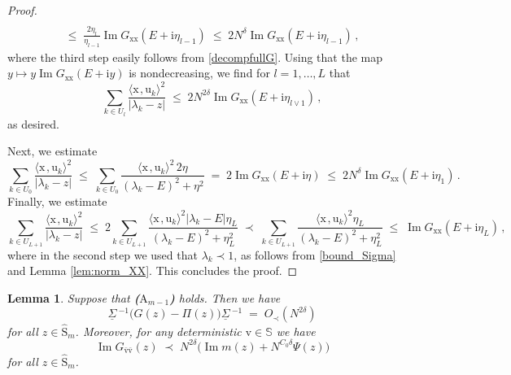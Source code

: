 \documentclass[11pt]{article} %
\numberwithin{equation}{section}
\numberwithin{figure}{section}
\theoremstyle{plain} %
\newtheorem{lemma}[theorem]{Lemma}
\theoremstyle{definition} %
\newcommand{\f}[1]{\boldsymbol{\mathrm{#1}}} %
\newcommand{\bb}{\mathbb} %
\newcommand{\ul}[1]{\underline{#1} \!\,} %
\newcommand{\wh}{\widehat}
\newcommand{\ii}{\mathrm{i}}
\renewcommand{\leq}{\leqslant}
\newcommand{\pb}[1]{\bigl({#1}\bigr)}
\newcommand{\abs}[1]{\lvert #1 \rvert}
\newcommand{\scalar}[2]{\langle{#1} \mspace{2mu}, {#2}\rangle}
\DeclareMathOperator{\im}{Im}
\begin{document}
\begin{proof}
\begin{multline*}
\\
\leq\; \frac{2 \eta_l}{\eta_{l - 1}} \im G_{\f x \f x}(E + \ii \eta_{l - 1}) \;\leq\; 2 N^\delta \im G_{\f x \f x}(E + \ii \eta_{l - 1})\,,
\end{multline*}
where the third step easily follows from \eqref{decompfullG}. Using that the map $y \mapsto y \im G_{\f x \f x}(E + \ii y)$ is nondecreasing, we find for $l = 1, \dots, L$ that
\begin{equation*}
\sum_{k \in U_l} \frac{\scalar{\f x}{\f u_k}^2}{\abs{\lambda_k - z}} \;\leq\;  2 N^{2 \delta} \im G_{\f x \f x}(E + \ii \eta_{l \vee 1})\,,
\end{equation*}
as desired.

Next, we estimate
\begin{equation*}
\sum_{k \in U_0} \frac{\scalar{\f x}{\f u_k}^2}{\abs{\lambda_k - z}} \;\leq\; \sum_{k \in U_0} \frac{\scalar{\f x}{\f u_k}^2 \, 2  \eta}{(\lambda_k - E)^2 + \eta^2} \;=\; 2 \im G_{\f x \f x} (E + \ii \eta) \;\leq\; 2 N^\delta \im G_{\f x \f x} (E + \ii \eta_1)\,.
\end{equation*}
Finally, we estimate
\begin{equation*}
\sum_{k \in U_{L+1}} \frac{\scalar{\f x}{\f u_k}^2}{\abs{\lambda_k - z}} \;\leq\; 2\sum_{k \in U_{L+1}} \frac{\scalar{\f x}{\f u_k}^2 \abs{\lambda_k - E} \eta_L}{(\lambda_k - E)^2 + \eta_L^2} \;\prec\; \sum_{k \in U_{L+1}} \frac{\scalar{\f x}{\f u_k}^2 \eta_L}{(\lambda_k - E)^2 + \eta_L^2} \;\leq\; \im G_{\f x \f x}(E + \ii \eta_L)\,,
\end{equation*}
where in the second step we used that $\lambda_k \prec 1$, as follows from \eqref{bound_Sigma} and Lemma \ref{lem:norm_XX}. This concludes the proof.
\end{proof}


\begin{lemma} \label{cor:rough_bound}
Suppose that \textbf{($\f A_{m - 1}$)} holds. Then we have
\begin{equation} \label{a_priori_1}
\ul \Sigma^{-1} \pb{G(z) - \Pi(z)} \ul \Sigma^{-1} \;=\; O_\prec(N^{2 \delta})
\end{equation}
for all $z \in \wh{\f S}_m$.
Moreover, for any deterministic $\f v \in \bb S$ we have
\begin{equation} \label{a_priori_2}
\im G_{\bar {\f v} \bar {\f v}}(z) \;\prec\; N^{2 \delta} \pb{\im m(z) + N^{C_0 \delta} \Psi(z)}
\end{equation}
for all $z \in \wh{\f S}_m$.
\end{lemma}
\end{document}
